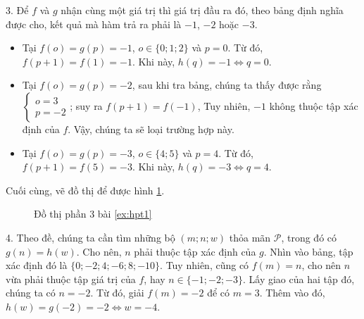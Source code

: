 3. Để $f$ và $g$ nhận cùng một giá trị thì giá trị đầu ra đó, theo bảng định nghĩa được cho, kết quả mà hàm trả ra phải là $-1$, $-2$ hoặc $-3$.
\begin{itemize}
   \item Tại $f(o) = g(p) = -1$, $o \in \{0; 1; 2\}$ và $p = 0$. Từ đó, $f(p + 1) = f(1) = -1$. Khi này, $h(q) = -1 \iff q = 0$.
   \item Tại $f(o) = g(p) = -2$, sau khi tra bảng, chúng ta thấy được rằng $\begin{cases}o = 3\\p = -2\end{cases}$; suy ra $f(p + 1) = f(-1)$, Tuy nhiên, $-1$ không thuộc tập xác định của $f$. Vậy, chúng ta sẽ loại trường hợp này.
   \item Tại $f(o) = g(p) = -3$, $o \in \{4; 5\}$ và $p = 4$. Từ đó, $f(p + 1) = f(5) = -3$. Khi này, $h(q) = -3 \iff q = 4$.
\end{itemize}
Cuối cùng, vẽ đồ thị để được hình \ref{fig:hpt13}.

\begin{figure}[H]
   \centering
   \caption{Đồ thị phần 3 bài \ref{ex:hpt1}}
   \label{fig:hpt13}
\end{figure}

4. Theo đề, chúng ta cần tìm những bộ $(m;n;w)$ thỏa mãn $\mathcal{P}$, trong đó có $g(n) = h(w)$. Cho nên, $n$ phải thuộc tập xác định của $g$. Nhìn vào bảng, tập xác định đó là $\{0; -2; 4; -6; 8; -10\}$. Tuy nhiên, cũng có $f(m) = n$, cho nên $n$ vừa phải thuộc tập giá trị của $f$, hay $n \in \{-1; -2; -3\}$. Lấy giao của hai tập đó, chúng ta có $n = -2$. Từ đó, giải $f(m) = -2$ để có $m = 3$. Thêm vào đó, $h(w) = g(-2) = -2 \iff w = -4$.

